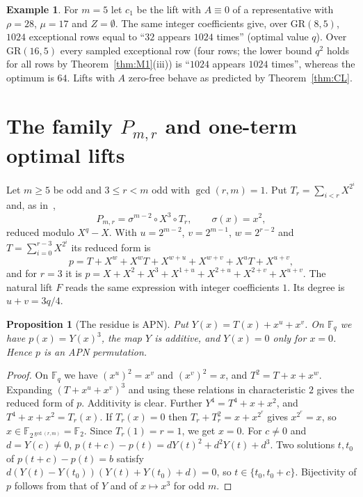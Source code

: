 \documentclass[11pt]{article}
\newtheorem{proposition}[theorem]{Proposition}
\theoremstyle{definition}
\newtheorem{example}[theorem]{Example}
\theoremstyle{remark}
\newcommand{\F}{\mathbb{F}}
\newcommand{\GR}{\mathrm{GR}}
\begin{document}
\begin{example}\label{ex:crosslevel}
For $m=5$ let $c_1$ be the lift with $A\equiv0$ of a representative with $\rho=28$, $\mu=17$ and $Z=\emptyset$. The same
integer coefficients give, over $\GR(8,5)$, $1024$ exceptional rows equal to ``$32$ appears $1024$ times''
(optimal value $q$). Over $\GR(16,5)$ every sampled exceptional row (four rows; the lower bound $q^2$ holds for all rows by
Theorem~\ref{thm:M1}(iii)) is ``$1024$ appears $1024$ times'', whereas the optimum is $64$. Lifts with $A$ zero-free behave as predicted by Theorem~\ref{thm:CL}.
\end{example}

\section{The family \texorpdfstring{$P_{m,r}$}{P(m,r)} and one-term optimal lifts}\label{sec:family}

Let $m\ge5$ be odd and $3\le r<m$ odd with $\gcd(r,m)=1$. Put $T_r=\sum_{i<r}X^{2^i}$ and, as
in~\cite[Thm.~3.1]{Fukui2},
\[
P_{m,r}=\sigma^{m-2}\circ X^3\circ T_r,\qquad\sigma(x)=x^2,
\]
reduced modulo $X^q-X$. With $u=2^{m-2}$, $v=2^{m-1}$, $w=2^{r-2}$ and $T=\sum_{i=0}^{r-3}X^{2^i}$ its reduced
form is
\[
p=T+X^w+X^wT+X^{w+u}+X^{w+v}+X^uT+X^{u+v},
\]
and for $r=3$ it is $p=X+X^2+X^3+X^{1+u}+X^{2+u}+X^{2+v}+X^{u+v}$. The natural lift $F$ reads the same
expression with integer coefficients $1$. Its degree is $u+v=3q/4$.

\begin{proposition}[The residue is APN]\label{prop:resAPN}
Put $Y(x)=T(x)+x^u+x^v$. On $\F_q$ we have $p(x)=Y(x)^3$, the map $Y$ is additive, and $Y(x)=0$ only for
$x=0$. Hence $p$ is an APN permutation.
\end{proposition}
\begin{proof}
On $\F_q$ we have $(x^u)^2=x^v$ and $(x^v)^2=x$, and $T^2=T+x+x^w$. Expanding $(T+x^u+x^v)^3$ and using these
relations in characteristic $2$ gives the reduced form of $p$. Additivity is clear. Further
$Y^4=T^4+x+x^2$, and $T^4+x+x^2=T_r(x)$. If $T_r(x)=0$ then $T_r+T_r^2=x+x^{2^r}$ gives $x^{2^r}=x$, so
$x\in\F_{2^{\gcd(r,m)}}=\F_2$. Since $T_r(1)=r=1$, we get $x=0$. For $c\ne0$ and $d=Y(c)\ne0$,
$p(t+c)-p(t)=dY(t)^2+d^2Y(t)+d^3$. Two solutions $t,t_0$ of $p(t+c)-p(t)=b$ satisfy
$d(Y(t)-Y(t_0))(Y(t)+Y(t_0)+d)=0$, so $t\in\{t_0,t_0+c\}$. Bijectivity of $p$ follows from that of $Y$
and of $x\mapsto x^3$ for odd $m$.
\end{proof}
\end{document}

